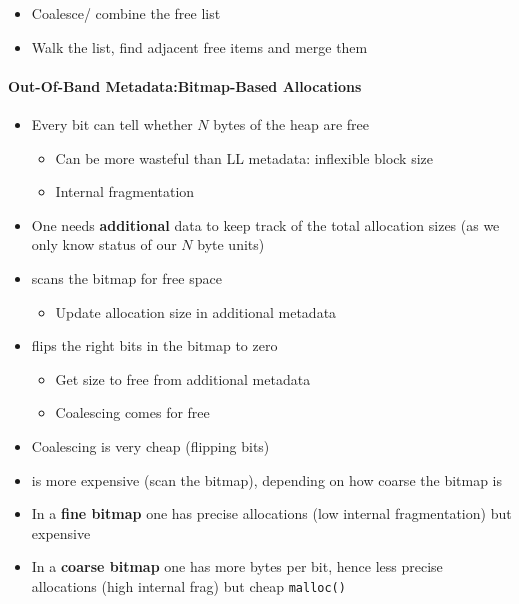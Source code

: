 
\begin{itemize}
    \item Coalesce/ combine the free list
    \item Walk the list, find adjacent free items and merge them
\end{itemize}

\paragraph[Bitmap-Based Allocations]{Out-Of-Band Metadata:\newline Bitmap-Based Allocations}
\begin{itemize}
    \item Every bit can tell whether $N$ bytes of the heap are free
    \begin{itemize}
        \item Can be more wasteful than LL metadata: inflexible block size
        \item Internal fragmentation    %
    \end{itemize}
    \item One needs \textbf{additional} data to keep track of the total allocation sizes (as we only know status of our $N$ byte units)
    \item {} scans the bitmap for free space %
    \begin{itemize}
        \item Update allocation size in additional metadata
    \end{itemize}
    \item {} flips the right bits in the bitmap to zero %
    \begin{itemize}
        \item Get size to free from additional metadata
        \item Coalescing comes for free
    \end{itemize}
\end{itemize}


\begin{itemize}
    \item Coalescing is very cheap (flipping bits)
    \item {} is more expensive (scan the bitmap), depending on how coarse the bitmap is %
    \item In a \textbf{fine bitmap} one has precise allocations (low internal fragmentation) but expensive  %
    \item In a \textbf{coarse bitmap} one has more bytes per bit, hence less precise allocations (high internal frag) but cheap \lstinline{malloc()} %
\end{itemize}


